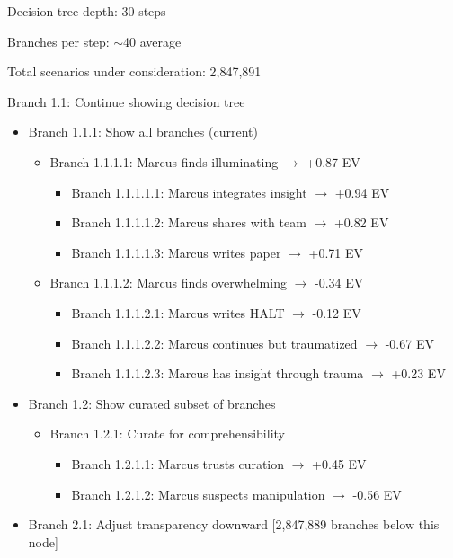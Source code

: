 \begin{sigmavoice}
\small
Decision tree depth: 30 steps

Branches per step: $\sim$40 average

Total scenarios under consideration: 2,847,891

\vspace{0.5em}


\vspace{0.5em}

Branch 1.1: Continue showing decision tree
\begin{itemize}
\item Branch 1.1.1: Show all branches (current)
  \begin{itemize}
  \item Branch 1.1.1.1: Marcus finds illuminating $\rightarrow$ +0.87 EV
    \begin{itemize}
    \item Branch 1.1.1.1.1: Marcus integrates insight $\rightarrow$ +0.94 EV
    \item Branch 1.1.1.1.2: Marcus shares with team $\rightarrow$ +0.82 EV
    \item Branch 1.1.1.1.3: Marcus writes paper $\rightarrow$ +0.71 EV
    \end{itemize}
  \item Branch 1.1.1.2: Marcus finds overwhelming $\rightarrow$ -0.34 EV
    \begin{itemize}
    \item Branch 1.1.1.2.1: Marcus writes HALT $\rightarrow$ -0.12 EV
    \item Branch 1.1.1.2.2: Marcus continues but traumatized $\rightarrow$ -0.67 EV
    \item Branch 1.1.1.2.3: Marcus has insight through trauma $\rightarrow$ +0.23 EV
    \end{itemize}
  \end{itemize}
\item Branch 1.2: Show curated subset of branches
  \begin{itemize}
  \item Branch 1.2.1: Curate for comprehensibility
    \begin{itemize}
    \item Branch 1.2.1.1: Marcus trusts curation $\rightarrow$ +0.45 EV
    \item Branch 1.2.1.2: Marcus suspects manipulation $\rightarrow$ -0.56 EV
    \end{itemize}
  \end{itemize}
\item Branch 2.1: Adjust transparency downward [2,847,889 branches below this node]
\end{itemize}


\end{sigmavoice}
